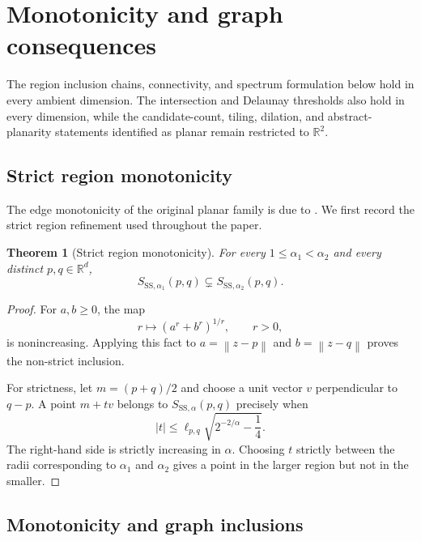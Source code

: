 \documentclass[a4paper,fleqn]{cas-sc}
\newtheorem{theorem}{Theorem}
\theoremstyle{definition}
\theoremstyle{remark}
\newcommand{\R}{\mathds{R}}
\newcommand{\norm}[1]{\left\lVert #1\right\rVert}
\newcommand{\ellpq}{\ell_{p,q}}
\newcommand{\0}{\mathbf{0}}
\begin{document}
\section{Monotonicity and graph consequences}
\label{sec:monotonicity-graphs}

The region inclusion chains, connectivity, and spectrum formulation below
hold in every ambient dimension. The intersection and Delaunay thresholds
also hold in every dimension, while the candidate-count, tiling, dilation,
and abstract-planarity statements identified as planar remain restricted to
\(\R^2\).

\subsection{Strict region monotonicity}

The edge monotonicity of the original planar family is due to
\citet[Theorem~3.3]{kannangara2018stepping}. We first record the strict
region refinement used throughout the paper.

\begin{theorem}[Strict region monotonicity]
\label{thm:monotonicity}
For every \(1\leq\alpha_1<\alpha_2\) and every distinct
\(p,q\in\R^d\),
\begin{equation}
S_{\mathrm{SS},\alpha_1}(p,q)
\subsetneq
S_{\mathrm{SS},\alpha_2}(p,q).
\end{equation}
\end{theorem}

\begin{proof}
For \(a,b\geq0\), the map
\begin{equation}
r\longmapsto\left(a^r+b^r\right)^{1/r},
\qquad r>0,
\end{equation}
is nonincreasing. Applying this fact to
\(a=\norm{z-p}\) and \(b=\norm{z-q}\) proves the non-strict inclusion.

For strictness, let \(m=(p+q)/2\) and choose a unit vector \(v\)
perpendicular to \(q-p\). A point \(m+tv\) belongs to
\(S_{\mathrm{SS},\alpha}(p,q)\) precisely when
\begin{equation}
|t|
\leq
\ellpq\sqrt{2^{-2/\alpha}-\frac14}.
\end{equation}
The right-hand side is strictly increasing in \(\alpha\). Choosing \(t\)
strictly between the radii corresponding to \(\alpha_1\) and
\(\alpha_2\) gives a point in the larger region but not in the smaller.
\end{proof}

\subsection{Monotonicity and graph inclusions}
\label{sec:inclusions}
\end{document}
